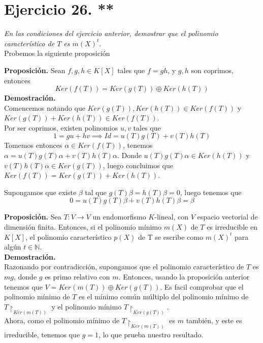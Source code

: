 \section{Ejercicio 26. **} \textit{En las condiciones del ejercicio anterior,
  demostrar que el polinomio característico de \(T\) es \(m(X)^t\)}.\\

Probemos la siguiente proposición

\textbf{Proposición. }Sean \(f,g,h \in K[X]\) tales que \(f = gh\), y \(g,h\) son
coprimos, entonces
\[
  Ker(f(T)) = Ker(g(T)) \oplus Ker(h(T))
\]
\textbf{Demostración.}\\
Comencemos notando que \(Ker(g(T)), Ker(h(T)) \in Ker(f(T))\) y \(Ker(g(T)) +
Ker(h(T)) \in Ker(f(T))\).\\ Por ser coprimos, existen polinomios \(u,v\) tales
que
\[
  1 = gu + hv \implies Id = u(T)g(T) + v(T)h(T)
\]
Tomemos entonces \(\alpha \in Ker(f(T))\), tenemos \(\alpha = u(T)g(T)\alpha +
v(T)h(T)\alpha\).
Donde  \( u(T)g(T)\alpha \in Ker(h(T))\) y  \( v(T)h(T)\alpha \in Ker(g(T))\),
luego concluimos que \(Ker(f(T)) = Ker(g(T)) + Ker(h(T))\).

Supongamos que existe \(\beta\) tal que \(g(T)\beta = h(T)\beta = 0\), luego
tenemos que
\[
  0 = u(T)g(T)\beta + v(T)h(T)\beta = \beta
\]

\textbf{Proposición.} Sea \(T: V \rightarrow V \) un endomorfismo \(K\)-lineal, con \(V\) espacio vectorial de dimensión finita. Entonces, si el polinomio mínimo \(m(X)\) de  \(T\) es irreducible en  \(K[X]\), el polinomio característico \(p(X)\) de T se escribe como \(m(X)^t\) para algún \(t \in \mathbb{N}\).\\

\textbf{Demostración.}\\
Razonando por contradicción, supongamos que el polinomio característico de \(T\) es  \(mg\), donde  \(g\) es primo relativo con \(m\). Entonces, usando la proposición anterior tenemos que \(V = Ker(m(T)) \oplus Ker(g(T))\). Es facil comprobar que el polinomio mínimo de \(T\) es el mínimo común múltiplo del polinomio mínimo de \(T\restriction_{Ker(m(T))}\) y el polinomio mínimo \(T\restriction_{Ker(g(T))}\).\\

Ahora, como el polinomio mínimo de \(T\restriction_{Ker(m(T))}\) es \(m\) también, y este es irreducible, tenemos que \(g = 1\), lo que prueba nuestro resultado.
